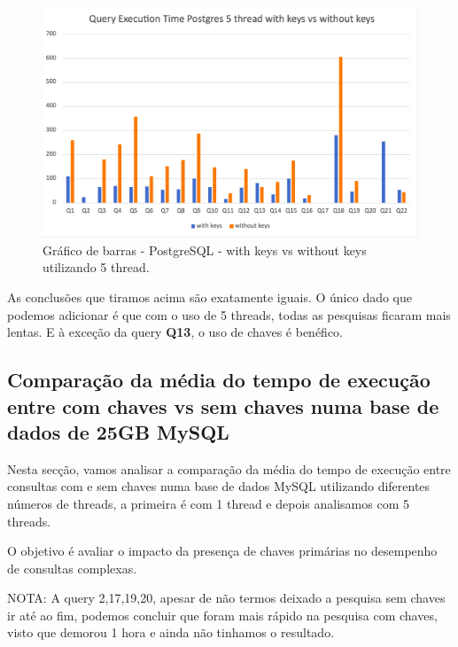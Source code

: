 \documentclass{article}
\begin{document}
\begin{figure}[H]
  \centering
  \includegraphics[width=\textwidth]{Graphs/postgres5threads_withkeysvswithoutkeys.png}
  \caption{Gráfico de barras - PostgreSQL - with keys vs without keys utilizando 5 thread.} 
  \label{fig:PKCreation2}
\end{figure}
As conclusões que tiramos acima são exatamente iguais. O único dado que podemos adicionar é que com o uso de 5 threads, todas as pesquisas ficaram mais lentas. E à exceção da query \textbf{Q13}, o uso de chaves é benéfico.

\clearpage


\subsection{Comparação da média do tempo de execução entre com chaves vs sem chaves numa base de dados de 25GB MySQL}

\texttt{}\par Nesta secção, vamos analisar a comparação da média do tempo de execução entre consultas com e sem chaves numa base de dados MySQL utilizando diferentes números de threads, a primeira é com 1 thread e depois analisamos com 5 threads.

O objetivo é avaliar o impacto da presença de chaves primárias no desempenho de consultas complexas.

NOTA: A query 2,17,19,20, apesar de não termos deixado a pesquisa sem chaves ir até ao fim, podemos concluir que foram mais rápido na pesquisa com chaves, visto que demorou 1 hora e ainda não tinhamos o resultado.
\end{document}
